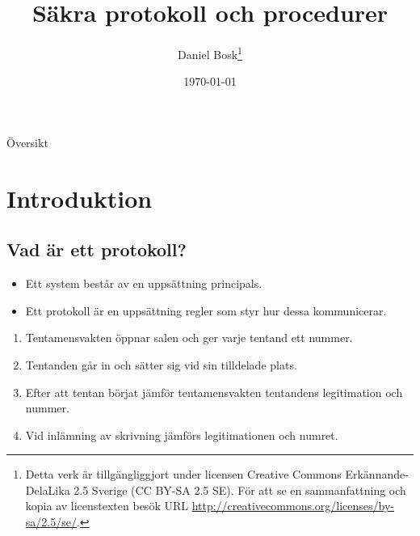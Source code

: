 \documentclass{beamer}
\title[Säkra protokoll]{%
  Säkra protokoll och procedurer
}
\author{Daniel Bosk\footnote{%
  Detta verk är tillgängliggjort under licensen Creative Commons 
  Erkännande-DelaLika 2.5 Sverige (CC BY-SA 2.5 SE).
	För att se en sammanfattning och kopia av licenstexten besök URL 
	\url{http://creativecommons.org/licenses/by-sa/2.5/se/}.
}}
\institute[MIUN IKS]{%
  Avdelningen för informations- och kommunikationssytem (IKS),\\
  Mittuniversitetet, Sundsvall.
}
\date{\today}
\theoremstyle{definition}
\theoremstyle{remark}
\begin{document}
\begin{frame}
  \titlepage{}
\end{frame}

\begin{frame}{Översikt}
  \tableofcontents
\end{frame}
%  





\section{Introduktion}

\subsection{Vad är ett protokoll?}

\begin{frame}{\insertsubsectionhead}
  \begin{itemize}
    \item Ett system består av en uppsättning principals.
    \item Ett protokoll är en uppsättning regler som styr hur dessa 
      kommunicerar.
  \end{itemize}
  \begin{example}
    \begin{enumerate}
      \item Tentamensvakten öppnar salen och ger varje tentand ett nummer.
      \item Tentanden går in och sätter sig vid sin tilldelade plats.
      \item Efter att tentan börjat jämför tentamensvakten tentandens 
        legitimation och nummer.
      \item Vid inlämning av skrivning jämförs legitimationen och numret.
    \end{enumerate}
  \end{example}
\end{frame}
\end{document}
